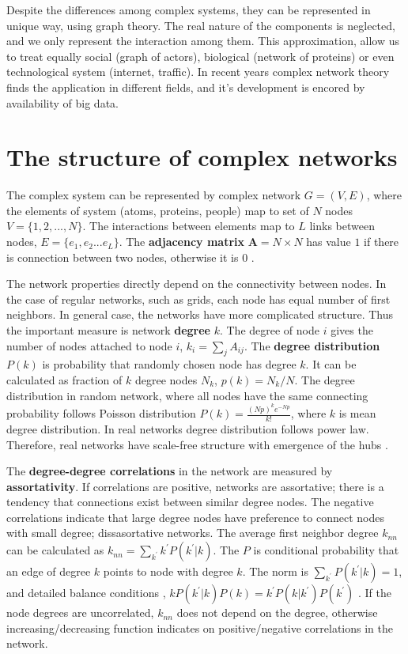 Despite the differences among complex systems, they can be represented in unique way, using graph theory. The real nature of the components is neglected, and we only represent the interaction among them. This approximation, allow us to treat equally social (graph of actors), biological (network of proteins) or even technological system (internet, traffic). In recent years complex network theory finds the application in different fields, and it's development is encored by availability of big data.


\section{The structure of complex networks}

The complex system can be represented by complex network $G=(V, E)$, where the elements of system (atoms, proteins, people) map to set of $N$ nodes $V=\{1, 2, ...,N\}$. The interactions between elements map to $L$ links between nodes, $E = \{ e_1, e_2... e_L\}$. The \textbf{adjacency matrix} $\boldsymbol{A} = N \times N$ has value $1$ if there is connection between two nodes, otherwise it is $0$ \cite{boccaletti2006}. 

The network properties directly depend on the connectivity between nodes. In the case of regular networks, such as grids, each node has equal number of first neighbors. In general case, the networks have more complicated structure. Thus the important measure is network \textbf{degree} $k$. The degree of node $i$ gives the number of nodes attached to node $i$, $k_i = \sum_j A_{ij}$. The \textbf{degree distribution} $P(k)$ is probability that randomly chosen node has degree $k$. It can be calculated as fraction of $k$ degree nodes $N_k$, $p(k) = N_k/N$. The degree distribution in random network, where all nodes have the same connecting probability follows Poisson distribution $P(k)= \frac{(Np)^ke^{-Np}}{k!}$, where $k$ is mean degree distribution. In real networks degree distribution follows power law. Therefore, real networks have scale-free structure with emergence of the hubs \cite{newman2010}.

The \textbf{degree-degree correlations} in the network are measured by \textbf{assortativity}. If correlations are positive, networks are assortative; there is a tendency that connections exist between similar degree nodes. The negative correlations indicate that large degree nodes have preference to connect nodes with small degree; dissasortative networks. The average first neighbor degree $k_{nn}$ can be calculated as $k_{nn} = \sum_{k^{'}}k^{'}P(k^{'}|{k})$. The $P$ is conditional probability that an edge of degree $k$ points to node with degree $k$. The norm is $\sum_{k^{'}}P(k^{'}|k)=1$, and detailed balance conditions \cite{boccaletti2006},  $kP(k^{'}|k)P(k) = k^{'}P(k|k^{'})P(k^{'})$ \cite{boccaletti2006}. If the node degrees are uncorrelated, $k_{nn}$ does not depend on the degree, otherwise increasing/decreasing function indicates on positive/negative correlations in the network.

